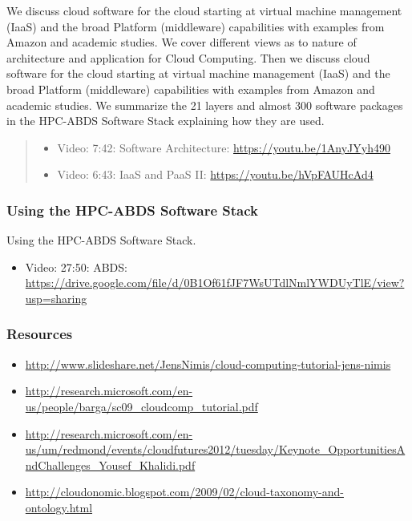 We discuss cloud software for the cloud starting at virtual machine
management (IaaS) and the broad Platform (middleware) capabilities with
examples from Amazon and academic studies. We cover different views as
to nature of architecture and application for Cloud Computing. Then we
discuss cloud software for the cloud starting at virtual machine
management (IaaS) and the broad Platform (middleware) capabilities with
examples from Amazon and academic studies. We summarize the 21 layers
and almost 300 software packages in the HPC-ABDS Software Stack
explaining how they are used.

\begin{quote}
\begin{itemize}
\tightlist
\item
  Video: 7:42: Software Architecture: \url{https://youtu.be/1AnyJYyh490}
\item
  Video: 6:43: IaaS and PaaS II: \url{https://youtu.be/hVpFAUHcAd4}
\end{itemize}
\end{quote}

\subsubsection{Using the HPC-ABDS Software
Stack}\label{using-the-hpc-abds-software-stack}

Using the HPC-ABDS Software Stack.

\begin{itemize}
\tightlist
\item
  Video: 27:50: ABDS:
  \url{https://drive.google.com/file/d/0B1Of61fJF7WsUTdlNmlYWDUyTlE/view?usp=sharing}
\end{itemize}

\subsubsection{Resources}\label{resources-2}

\begin{itemize}
\tightlist
\item
  \url{http://www.slideshare.net/JensNimis/cloud-computing-tutorial-jens-nimis}
\item
  \url{http://research.microsoft.com/en-us/people/barga/sc09_cloudcomp_tutorial.pdf}
\item
  \url{http://research.microsoft.com/en-us/um/redmond/events/cloudfutures2012/tuesday/Keynote_OpportunitiesAndChallenges_Yousef_Khalidi.pdf}
\item
  \url{http://cloudonomic.blogspot.com/2009/02/cloud-taxonomy-and-ontology.html}
\end{itemize}


